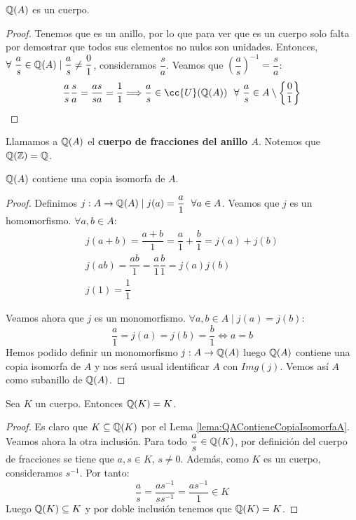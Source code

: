 \begin{lema}
    $\mathbb Q(A)$ es un cuerpo.
\end{lema}
\begin{proof} Tenemos que es un anillo, por lo que para ver que es un cuerpo solo falta por demostrar que todos sus elementos no nulos son unidades. Entonces, $\forall ~\dfrac{a}{s} \in \mathbb Q(A) \mid \dfrac{a}{s} \neq \dfrac{0}{1}$, consideramos $\dfrac{s}{a}$. Veamos que $\left(\dfrac{a}{s}\right)^{-1} = \dfrac{s}{a}$:
    $$\dfrac{a}{s}\dfrac{s}{a} = \dfrac{as}{sa} = \dfrac{1}{1} \Longrightarrow \dfrac{a}{s} \in \cc{U}(\Q(A))~~\forall ~\dfrac{a}{s}
        \in A \setminus\left\{\dfrac{0}{1}\right\}$$
\end{proof}

\bigskip

\noindent
Llamamos a $\mathbb Q(A)$ el \textbf{cuerpo de fracciones del anillo $A$}. Notemos que $\mathbb Q(\mathbb Z) = \mathbb Q$.

\begin{lema}
    \label{lema:QAContieneCopiaIsomorfaA}
    $\mathbb Q(A)$ contiene una copia isomorfa de $A$.
\end{lema}
\begin{proof}
    Definimos $j:A\rightarrow \mathbb Q(A) \mid j(a) = \dfrac{a}{1}~~\forall a \in A$.
    Veamos que $j$ es un homomorfismo. $\forall a,b \in A$:
    \begin{gather*}
        j(a+b) = \dfrac{a+b}{1} = \dfrac{a}{1} + \dfrac{b}{1} = j(a) + j(b) \\
        j(ab) = \dfrac{ab}{1} = \dfrac{a}{1} \dfrac{b}{1} = j(a)j(b) \\
        j(1) = \dfrac{1}{1}
    \end{gather*}
    
    Veamos ahora que $j$ es un monomorfismo. $\forall a,b \in A \mid j(a) = j(b)$:
    $$\dfrac{a}{1} = j(a) = j(b) = \dfrac{b}{1} \Longleftrightarrow a = b$$
    Hemos podido definir un monomorfismo $j:A\rightarrow \mathbb Q(A)$ luego $\mathbb Q(A)$ contiene una copia isomorfa de $A$ y nos será usual identificar $A$ con $Img(j)$. Vemos así $A$ como subanillo de $\mathbb Q(A)$.
\end{proof}

\begin{lema}
    Sea $K$ un cuerpo. Entonces $\mathbb Q(K) = K$.
\end{lema}
\begin{proof}
    Es claro que $K \subseteq \mathbb Q(K)$ por el Lema \ref{lema:QAContieneCopiaIsomorfaA}. Veamos ahora la otra inclusión. Para todo $\dfrac{a}{s} \in \mathbb Q(K)$, por definición del cuerpo de fracciones se tiene que $a,s\in K$, $s\neq 0$. Además, como $K$ es un cuerpo, consideramos $s^{-1}$. Por tanto:
    $$\dfrac{a}{s} = \dfrac{as^{-1}}{ss^{-1}} = \dfrac{as^{-1}}{1} \in K$$
    Luego $\mathbb Q(K) \subseteq K$ y por doble inclusión tenemos que $\mathbb Q(K) = K$.
\end{proof}


